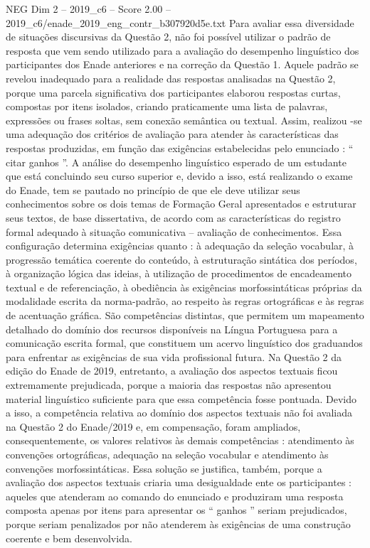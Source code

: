 \begin{textsample}{NEG Dim 2 – 2019\_c6 – Score 2.00 – 2019\_c6/enade\_2019\_eng\_contr\_b307920d5e.txt}
Para avaliar essa diversidade de situações discursivas da Questão 2, não foi possível utilizar o padrão de resposta que vem sendo utilizado para a avaliação do desempenho linguístico dos participantes dos Enade anteriores e na correção da Questão 1.
Aquele padrão se revelou inadequado para a realidade das respostas analisadas na Questão 2, porque uma parcela significativa dos participantes elaborou respostas curtas, compostas por itens isolados, criando praticamente uma lista de palavras, expressões ou frases soltas, sem conexão semântica ou textual.
Assim, realizou -se uma adequação dos critérios de avaliação para atender às características das respostas produzidas, em função das exigências estabelecidas pelo enunciado : “ citar ganhos ”.
A análise do desempenho linguístico esperado de um estudante que está concluindo seu curso superior e, devido a isso, está realizando o exame do Enade, tem se pautado no princípio de que ele deve utilizar seus conhecimentos sobre os dois temas de Formação Geral apresentados e estruturar seus textos, de base dissertativa, de acordo com as características do registro formal adequado à situação comunicativa – avaliação de conhecimentos.
Essa configuração determina exigências quanto : à adequação da seleção vocabular, à progressão temática coerente do conteúdo, à estruturação sintática dos períodos, à organização lógica das ideias, à utilização de procedimentos de encadeamento textual e de referenciação, à obediência às exigências morfossintáticas próprias da modalidade escrita da norma-padrão, ao respeito às regras ortográficas e às regras de acentuação gráfica.
São competências distintas, que permitem um mapeamento detalhado do domínio dos recursos disponíveis na Língua Portuguesa para a comunicação escrita formal, que constituem um acervo linguístico dos graduandos para enfrentar as exigências de sua vida profissional futura.
Na Questão 2 da edição do Enade de 2019, entretanto, a avaliação dos aspectos textuais ficou extremamente prejudicada, porque a maioria das respostas não apresentou material linguístico suficiente para que essa competência fosse pontuada.
Devido a isso, a competência relativa ao domínio dos aspectos textuais não foi avaliada na Questão 2 do Enade/2019 e, em compensação, foram ampliados, consequentemente, os valores relativos às demais competências : atendimento às convenções ortográficas, adequação na seleção vocabular e atendimento às convenções morfossintáticas.
Essa solução se justifica, também, porque a avaliação dos aspectos textuais criaria uma desigualdade ente os participantes : aqueles que atenderam ao comando do enunciado e produziram uma resposta composta apenas por itens para apresentar os “ ganhos ” seriam prejudicados, porque seriam penalizados por não atenderem às exigências de uma construção coerente e bem desenvolvida.

\end{textsample}
